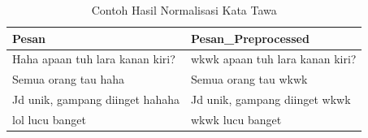 \begingroup
\renewcommand{\arraystretch}{1}
\begin{table}[H]
\centering
\caption{Contoh Hasil Normalisasi Kata Tawa}
\label{tab:laughter-normalization}
\scriptsize
\begin{tabular}{p{5.5cm} p{5.5cm}}
\toprule
\textbf{Pesan} & \textbf{Pesan\_Preprocessed} \\
\midrule
Haha apaan tuh lara kanan kiri? &
wkwk apaan tuh lara kanan kiri? \\

Semua orang tau haha &
Semua orang tau wkwk \\

Jd unik, gampang diinget hahaha &
Jd unik, gampang diinget wkwk \\

lol lucu banget &
wkwk lucu banget \\
\bottomrule
\end{tabular}
\end{table}
\endgroup